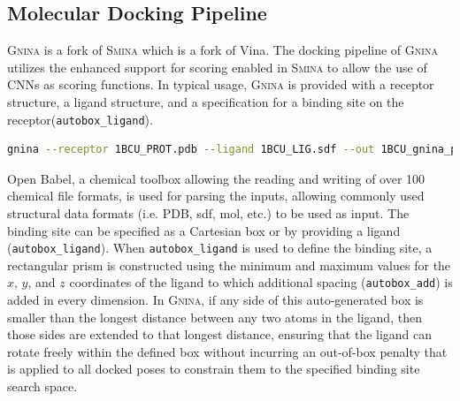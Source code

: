 \documentclass[journal=jcisd8,manuscript=article]{achemso}
\begin{document}
\subsection{Molecular Docking Pipeline}
\textsc{\textsc{Gnina}} is a fork of \textsc{Smina}\cite{koes2013lessons} which is a fork of Vina\cite{trott2010autodock}. The docking pipeline of \textsc{\textsc{Gnina}} utilizes the enhanced support for scoring enabled in \textsc{Smina} to allow the use of CNNs as scoring functions. In typical usage, \textsc{\textsc{Gnina}} is provided with a receptor structure, a ligand structure, and a specification for a binding site on the receptor(\texttt{autobox\_ligand}).
\begin{lstlisting}[title=Example Gnina Usage,label=code:Usage,language=bash]
    gnina --receptor 1BCU_PROT.pdb --ligand 1BCU_LIG.sdf --out 1BCU_gnina_poses.sdf.gz --autobox_ligand 1BCU_LIG.sdf --autobox_add 4 --cnn Crossdock_Default2018 Dense_3 --cnn_scoring rescore --exhaustiveness 8 --num_mc_saved 50 --cnn_rotation 0 --num_modes 9 --min_rmsd_filter 1
\end{lstlisting}
Open Babel\cite{o2011open,babelopen}, a chemical toolbox allowing the reading and writing of over 100 chemical file formats, is used for parsing the inputs, allowing commonly used structural data formats (i.e. PDB, sdf, mol, etc.) to be used as input. The binding site can be specified as a Cartesian box or by providing a ligand (\texttt{autobox\_ligand}).  When \texttt{autobox\_ligand} is used to define the binding site, a rectangular prism is constructed using the minimum and maximum values for the $x$, $y$, and $z$ coordinates of the ligand to which additional spacing (\texttt{autobox\_add}) is added in every dimension. In \textsc{Gnina}, if any side of this auto-generated box is smaller than the longest distance between any two atoms in the ligand, then those sides are extended to that longest distance, ensuring that the ligand can rotate freely within the defined box without incurring an out-of-box penalty that is applied to all docked poses to constrain them to the specified binding site search space.
\end{document}
